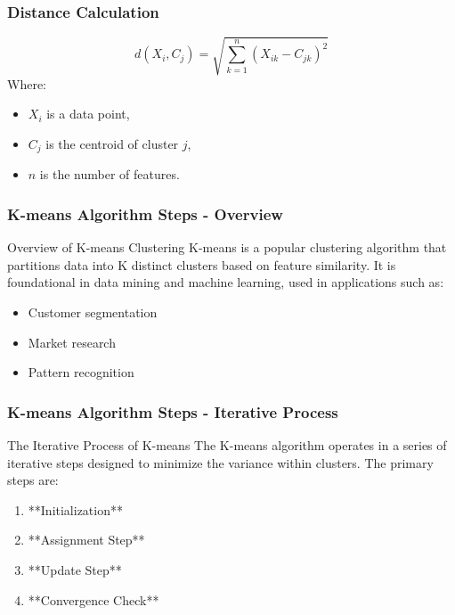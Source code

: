 \documentclass[aspectratio=169]{beamer}
\begin{document}
\begin{frame}[fragile]
    \frametitle{Distance Calculation}
    \begin{equation}
        d(X_i, C_j) = \sqrt{\sum_{k=1}^{n}(X_{ik} - C_{jk})^2}
    \end{equation}
    Where:
    \begin{itemize}
        \item \( X_i \) is a data point,
        \item \( C_j \) is the centroid of cluster \( j \),
        \item \( n \) is the number of features.
    \end{itemize}
\end{frame}

\begin{frame}[fragile]
    \frametitle{K-means Algorithm Steps - Overview}
    \begin{block}{Overview of K-means Clustering}
        K-means is a popular clustering algorithm that partitions data into K distinct clusters based on feature similarity. 
        It is foundational in data mining and machine learning, used in applications such as:
        \begin{itemize}
            \item Customer segmentation
            \item Market research
            \item Pattern recognition
        \end{itemize}
    \end{block}
\end{frame}

\begin{frame}[fragile]
    \frametitle{K-means Algorithm Steps - Iterative Process}
    \begin{block}{The Iterative Process of K-means}
        The K-means algorithm operates in a series of iterative steps designed to minimize the variance within clusters. The primary steps are:
        \begin{enumerate}
            \item **Initialization**
            \item **Assignment Step**
            \item **Update Step**
            \item **Convergence Check**
        \end{enumerate}
    \end{block}
\end{frame}
\end{document}
